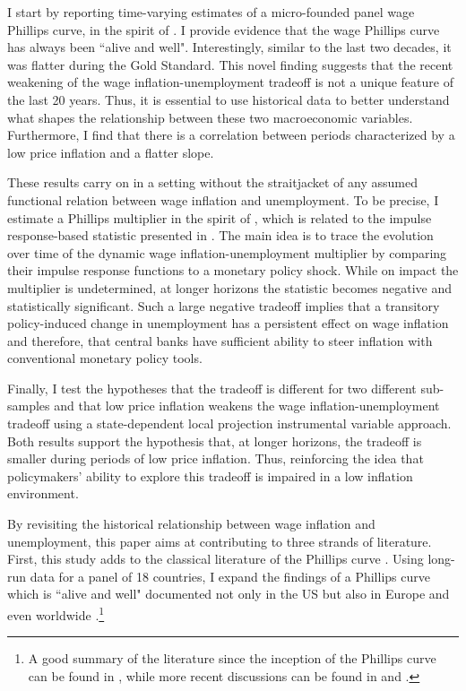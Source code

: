 \documentclass[12pt]{article}
\begin{document}
I start by reporting time-varying estimates of a micro-founded panel wage Phillips curve, in the spirit of \cite{Gali2011}. I provide evidence that the wage Phillips curve has always been ``alive and well". Interestingly, similar to the last two decades, it was flatter during the Gold Standard. This novel finding suggests that the recent weakening of the wage inflation-unemployment tradeoff is not a unique feature of the last 20 years. Thus, it is essential to use historical data to better understand what shapes the relationship between these two macroeconomic variables. Furthermore, I find that there is a correlation between periods characterized by a low price inflation and a flatter slope.

These results carry on in a setting without the straitjacket of any assumed functional relation between wage inflation and unemployment. To be precise, I estimate a Phillips multiplier in the spirit of \cite{Barnichon2019}, which is related to the impulse response-based statistic presented in \cite{Gali2019}. The main idea is to trace the evolution over time of the dynamic wage inflation-unemployment multiplier by comparing their impulse response functions to a monetary policy shock. While on impact the multiplier is undetermined, at longer horizons the statistic becomes negative and statistically significant. Such a large negative tradeoff implies that a transitory policy-induced change in unemployment has a persistent effect on wage inflation and therefore, that central banks have sufficient ability to steer inflation with conventional monetary policy tools.

Finally, I test the hypotheses that the tradeoff is different for two different sub-samples and that low price inflation weakens the wage inflation-unemployment tradeoff using a state-dependent local projection instrumental variable approach. Both results support the hypothesis that, at longer horizons, the tradeoff is smaller during periods of low price inflation. Thus, reinforcing the idea that policymakers' ability to explore this tradeoff is impaired in a low inflation environment.

By revisiting the historical relationship between wage inflation and unemployment, this paper aims at contributing to three strands of literature. First, this study adds to the classical literature of the Phillips curve \citep{Phillips1958}. Using long-run data for a panel of 18 countries, I expand the findings of a Phillips curve which is ``alive and well" documented not only in the US \citep{Coibion2015, Blanchard2016, Hoynck2020, DelNegro2020, Ascari2021, Hazell2021, Bergholt2023} but also in Europe \citep{Levy2019, Onorante2019, Bonam2021} and even worldwide \citep{Coibion2019}.\footnote{A good summary of the literature since the inception of the Phillips curve can be found in \cite{Gordon2011}, while more recent discussions can be found in \cite{Mavroeidis2014} and \cite{Coibion2018}.} 
\end{document}
